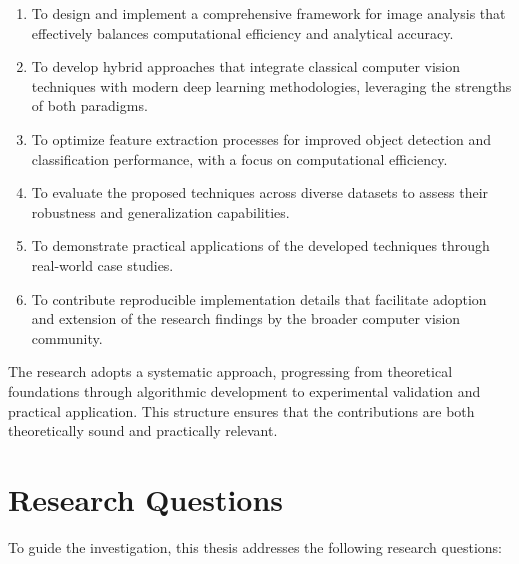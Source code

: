 \begin{enumerate}
    \item To design and implement a comprehensive framework for image analysis that effectively balances computational efficiency and analytical accuracy.
    
    \item To develop hybrid approaches that integrate classical computer vision techniques with modern deep learning methodologies, leveraging the strengths of both paradigms.
    
    \item To optimize feature extraction processes for improved object detection and classification performance, with a focus on computational efficiency.
    
    \item To evaluate the proposed techniques across diverse datasets to assess their robustness and generalization capabilities.
    
    \item To demonstrate practical applications of the developed techniques through real-world case studies.
    
    \item To contribute reproducible implementation details that facilitate adoption and extension of the research findings by the broader computer vision community.
\end{enumerate}

The research adopts a systematic approach, progressing from theoretical foundations through algorithmic development to experimental validation and practical application. This structure ensures that the contributions are both theoretically sound and practically relevant.

\section{Research Questions}
To guide the investigation, this thesis addresses the following research questions:


